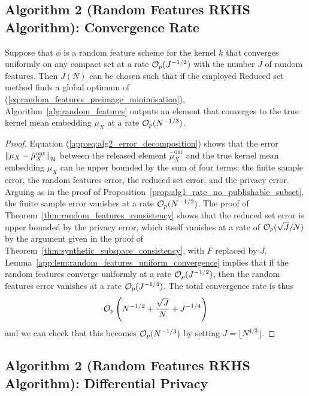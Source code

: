 \subsection{Algorithm 2 (Random Features RKHS Algorithm): Convergence Rate}
\label{app:sec:random_features_convergence_rate}

\begin{hprop}[\ref{thm:random_features_consistency}]
Suppose that $\phi$ is a random feature scheme for the kernel $k$ that converges uniformly on any compact set at a rate $\mathcal{O}_p(J^{-1/2})$ with the number $J$ of random features. Then $J(N)$ can be chosen such that if the employed Reduced set method finds a global optimum of (\ref{eq:random_features_preimage_minimisation}), Algorithm~\ref{alg:random_features} outputs an element that converges to the true kernel mean embedding $\mu_X$ at a rate $\mathcal{O}_p(N^{-1/3})$.
\begin{proof}
Equation (\ref{app:eq:alg2_error_decomposition}) shows that the error $\left\| \mu_X - \hat{\mu}^{\text{out}}_X \right\|_{\mathcal{H}}$ between the released element $\hat{\mu}^{\text{out}}_X$ and the true kernel mean embedding $\mu_X$ can be upper bounded by the sum of four terms: the finite sample error, the random features error, the reduced set error, and the privacy error.
Arguing as in the proof of Proposition~\ref{prop:alg1_rate_no_publishable_subset}, the finite sample error vanishes at a rate $\mathcal{O}_p(N^{-1/2})$.
The proof of Theorem~\ref{thm:random_features_consistency} shows that the reduced set error is upper bounded by the privacy error, which itself vanishes at a rate of $\mathcal{O}_p(\sqrt{J}/N)$ by the argument given in the proof of Theorem~\ref{thm:synthetic_subspace_consistency}, with $F$ replaced by $J$.
Lemma~\ref{app:lem:random_features_uniform_convergence} implies that if the random features converge uniformly at a rate $\mathcal{O}_p(J^{-1/2})$, then the random features error vanishes at a rate $\mathcal{O}_p(J^{-1/4})$. The total convergence rate is thus
\begin{equation*}
\mathcal{O}_p\left( N^{-1/2} + \frac{\sqrt{J}}{N} + J^{-1/4} \right)
\end{equation*}
and we can check that this becomes $\mathcal{O}_p(N^{-1/3})$ by setting $J = \lfloor N^{4/3} \rfloor$.
\end{proof}
\end{hprop}



\subsection{Algorithm 2 (Random Features RKHS Algorithm): Differential Privacy}
\label{app:sec:random_features_privacy}

